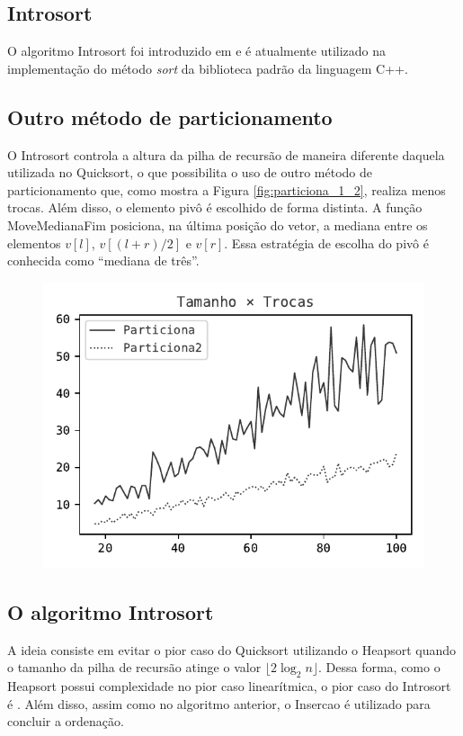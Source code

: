 \subsection{Introsort}
O algoritmo Introsort foi introduzido em \cite{musser1997introspective} e é atualmente utilizado na implementação do método \textit{sort} da biblioteca padrão da linguagem C++.

\subsection*{Outro método de particionamento}
O Introsort controla a altura da pilha de recursão de maneira diferente daquela utilizada no Quicksort, o que possibilita o uso de outro método de particionamento que, como mostra a Figura \ref{fig:particiona_1_2}, realiza menos trocas. Além disso, o elemento pivô é escolhido de forma distinta. A função MoveMedianaFim posiciona, na última posição do vetor, a mediana entre os elementos $v[l]$, $v[(l + r)/2]$ e $v[r]$. Essa estratégia de escolha do pivô é conhecida como ``mediana de três''.


\begin{figure}[H]
\centering
\includegraphics{figuras/pdf/particiona_1_2.pdf}
\end{figure}

\subsection*{O algoritmo Introsort}
A ideia consiste em evitar o pior caso do Quicksort utilizando o Heapsort quando o tamanho da pilha de recursão atinge o valor $\lfloor2\log_2 n\rfloor$. Dessa forma, como o Heapsort possui complexidade no pior caso linearítmica, o pior caso do Introsort é . Além disso, assim como no algoritmo anterior, o Insercao é utilizado para concluir a ordenação.

